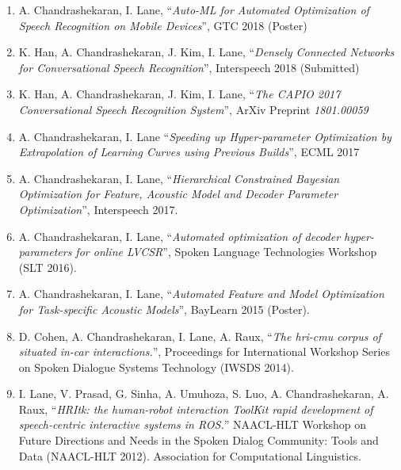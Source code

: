 \begin{enumerate}
\item A. Chandrashekaran, I. Lane, ``\emph{Auto-ML for Automated Optimization of Speech Recognition on Mobile Devices}'', GTC 2018 (Poster)
\item K. Han, A. Chandrashekaran, J. Kim, I. Lane, ``\emph{Densely Connected Networks for Conversational Speech Recognition}'', Interspeech 2018 (Submitted)
\item K. Han, A. Chandrashekaran, J. Kim, I. Lane, ``\emph{The CAPIO 2017 Conversational Speech Recognition System}'', ArXiv Preprint \emph{1801.00059} 
\item A. Chandrashekaran, I. Lane ``\emph{Speeding up Hyper-parameter Optimization by Extrapolation of Learning Curves using Previous Builds}'', ECML 2017
\item A. Chandrashekaran, I. Lane, ``\emph{Hierarchical Constrained Bayesian Optimization for Feature, Acoustic Model and Decoder Parameter Optimization}'', Interspeech 2017.
\item  A. Chandrashekaran, I. Lane, ``\emph{Automated optimization of decoder hyper-parameters for online LVCSR}'', Spoken Language Technologies Workshop (SLT 2016).
\item  A. Chandrashekaran, I. Lane, ``\emph{Automated Feature and Model Optimization for Task-specific Acoustic Models}'', BayLearn 2015 (Poster).

\item D. Cohen, A. Chandrashekaran, I. Lane, A. Raux, ``\emph{The hri-cmu corpus of situated in-car interactions.}'', Proceedings for International Workshop Series on Spoken Dialogue Systems Technology (IWSDS 2014).
 
 \item I. Lane, V. Prasad, G. Sinha, A. Umuhoza, S. Luo, A. Chandrashekaran, A. Raux, ``\emph{HRItk: the human-robot interaction ToolKit rapid development of speech-centric interactive systems in ROS.}'' NAACL-HLT Workshop on Future Directions and Needs in the Spoken Dialog Community: Tools and Data (NAACL-HLT 2012). Association for Computational Linguistics.
 \end{enumerate}

 








